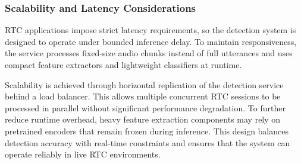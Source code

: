 \subsubsection{Scalability and Latency Considerations}

RTC applications impose strict latency requirements, so the detection system is designed to operate under bounded inference delay. To maintain responsiveness, the service processes fixed-size audio chunks instead of full utterances and uses compact feature extractors and lightweight classifiers at runtime.

Scalability is achieved through horizontal replication of the detection service behind a load balancer. This allows multiple concurrent RTC sessions to be processed in parallel without significant performance degradation. To further reduce runtime overhead, heavy feature extraction components may rely on pretrained encoders that remain frozen during inference. This design balances detection accuracy with real-time constraints and ensures that the system can operate reliably in live RTC environments.